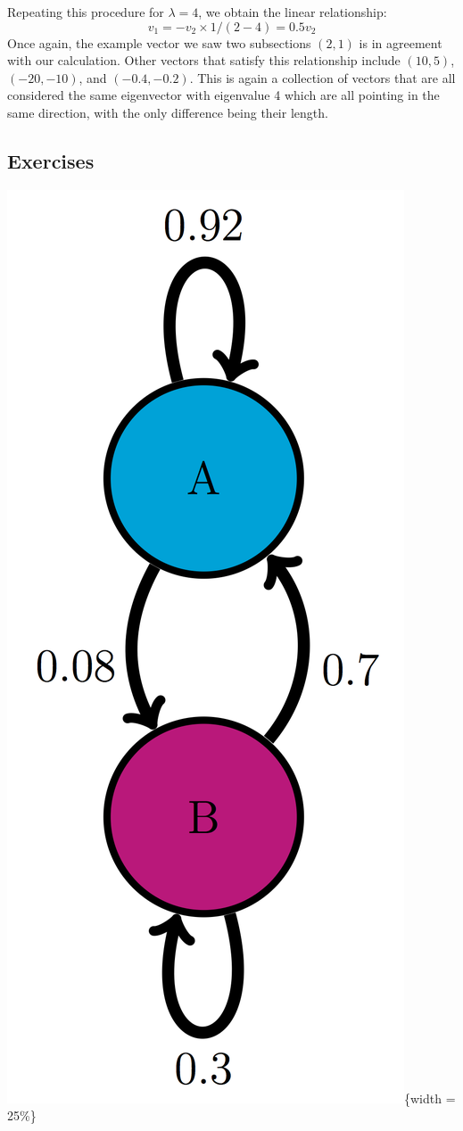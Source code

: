 \documentclass[
]{book}
\theoremstyle{definition}
\theoremstyle{definition}
\theoremstyle{definition}
\theoremstyle{remark}
\begin{document}
Repeating this procedure for \(\lambda = 4\), we obtain the linear relationship:
\[ v_1 = - v_2 \times  1/(2-4) = 0.5 v_2\]
Once again, the example vector we saw two subsections \((2,1)\) is in agreement with our calculation. Other vectors that satisfy this relationship include \((10,5)\), \((-20,-10)\), and \((-0.4,-0.2)\). This is again a collection of vectors that are all considered the same eigenvector with eigenvalue 4 which are all pointing in the same direction, with the only difference being their length.

\hypertarget{exercises-31}{%
\subsection{Exercises}\label{exercises-31}}

\includegraphics{ch10/AB_trans_diag.png}\{width = 25\%\}
\end{document}
